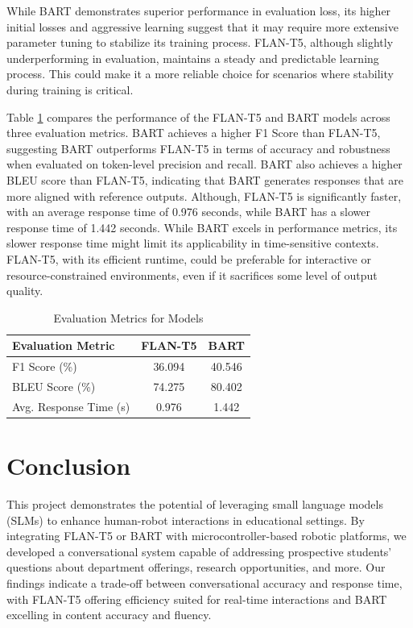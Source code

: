 \documentclass[conference]{IEEEtran}
\begin{document}
While BART demonstrates superior performance in evaluation loss, its higher initial losses and aggressive learning suggest that it may require more extensive parameter tuning to stabilize its training process.
FLAN-T5, although slightly underperforming in evaluation, maintains a steady and predictable learning process. This could make it a more reliable choice for scenarios where stability during training is critical.

Table \ref{tab:eval_metric} compares the performance of the FLAN-T5 and BART models across three evaluation metrics.
BART achieves a higher F1 Score than FLAN-T5, suggesting BART outperforms FLAN-T5 in terms of accuracy and robustness when evaluated on token-level precision and recall.
BART also achieves a higher BLEU score than FLAN-T5, indicating that BART generates responses that are more aligned with reference outputs.
Although, FLAN-T5 is significantly faster, with an average response time of 0.976 seconds, while BART has a slower response time of 1.442 seconds.
While BART excels in performance metrics, its slower response time might limit its applicability in time-sensitive contexts.
FLAN-T5, with its efficient runtime, could be preferable for interactive or resource-constrained environments, even if it sacrifices some level of output quality.

\begin{table}[!ht]
    \centering
    \caption{Evaluation Metrics for Models}
    \label{tab:eval_metric}
    \begin{tabular}{l|c|c}
        \toprule
        \textbf{Evaluation Metric}         & \textbf{FLAN-T5}         & \textbf{BART} \\
        \midrule
        F1 Score (\%)                      & 36.094                   & 40.546                     \\ 
        BLEU Score (\%)                    & 74.275                   & 80.402                      \\ 
        Avg. Response Time (s)             & 0.976                    & 1.442                      \\
        \bottomrule
    \end{tabular}
\end{table}

\section{Conclusion}
This project demonstrates the potential of leveraging small language models (SLMs) to enhance human-robot interactions in educational settings. 
By integrating FLAN-T5 or BART with microcontroller-based robotic platforms, we developed a conversational system capable of addressing prospective students' questions about department offerings, research opportunities, and more. 
Our findings indicate a trade-off between conversational accuracy and response time, with FLAN-T5 offering efficiency suited for real-time interactions and BART excelling in content accuracy and fluency.
\end{document}
